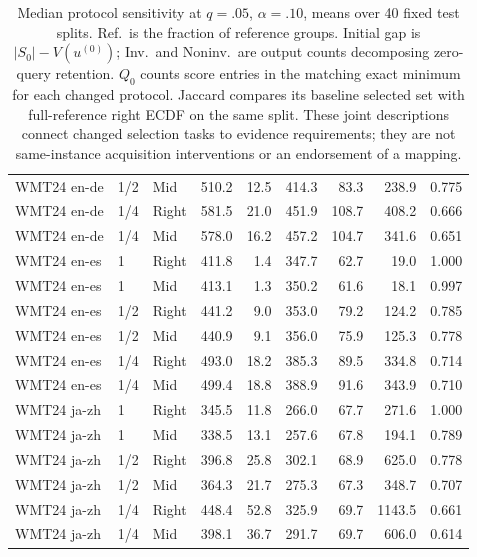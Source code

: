 \begin{table}[t]
\begin{tabular}{lllrrrrrr}
WMT24 en-de & 1/2 & Mid & 510.2 & 12.5 & 414.3 & 83.3 & 238.9 & 0.775 \\
WMT24 en-de & 1/4 & Right & 581.5 & 21.0 & 451.9 & 108.7 & 408.2 & 0.666 \\
WMT24 en-de & 1/4 & Mid & 578.0 & 16.2 & 457.2 & 104.7 & 341.6 & 0.651 \\
WMT24 en-es & 1 & Right & 411.8 & 1.4 & 347.7 & 62.7 & 19.0 & 1.000 \\
WMT24 en-es & 1 & Mid & 413.1 & 1.3 & 350.2 & 61.6 & 18.1 & 0.997 \\
WMT24 en-es & 1/2 & Right & 441.2 & 9.0 & 353.0 & 79.2 & 124.2 & 0.785 \\
WMT24 en-es & 1/2 & Mid & 440.9 & 9.1 & 356.0 & 75.9 & 125.3 & 0.778 \\
WMT24 en-es & 1/4 & Right & 493.0 & 18.2 & 385.3 & 89.5 & 334.8 & 0.714 \\
WMT24 en-es & 1/4 & Mid & 499.4 & 18.8 & 388.9 & 91.6 & 343.9 & 0.710 \\
WMT24 ja-zh & 1 & Right & 345.5 & 11.8 & 266.0 & 67.7 & 271.6 & 1.000 \\
WMT24 ja-zh & 1 & Mid & 338.5 & 13.1 & 257.6 & 67.8 & 194.1 & 0.789 \\
WMT24 ja-zh & 1/2 & Right & 396.8 & 25.8 & 302.1 & 68.9 & 625.0 & 0.778 \\
WMT24 ja-zh & 1/2 & Mid & 364.3 & 21.7 & 275.3 & 67.3 & 348.7 & 0.707 \\
WMT24 ja-zh & 1/4 & Right & 448.4 & 52.8 & 325.9 & 69.7 & 1143.5 & 0.661 \\
WMT24 ja-zh & 1/4 & Mid & 398.1 & 36.7 & 291.7 & 69.7 & 606.0 & 0.614 \\
\bottomrule
\end{tabular}
\caption{Median protocol sensitivity at $q=.05$, $\alpha=.10$, means over 40 fixed test splits. Ref.\ is the fraction of reference groups. Initial gap is $|S_0|-V(u^{(0)})$; Inv.\ and Noninv.\ are output counts decomposing zero-query retention. $Q_0$ counts score entries in the matching exact minimum for each changed protocol. Jaccard compares its baseline selected set with full-reference right ECDF on the same split. These joint descriptions connect changed selection tasks to evidence requirements; they are not same-instance acquisition interventions or an endorsement of a mapping.}
\label{tab:protocol-evidence}
\end{table}
